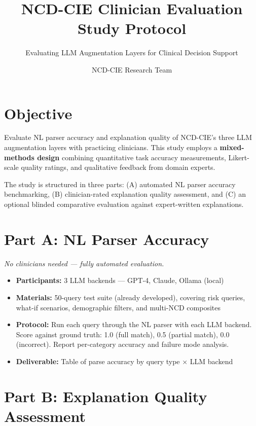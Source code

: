 \documentclass[runningheads,a4paper]{llncs}
\begin{document}
\title{NCD-CIE Clinician Evaluation Study Protocol}
\subtitle{Evaluating LLM Augmentation Layers for Clinical Decision Support}
\author{NCD-CIE Research Team}
\maketitle

\section{Objective}

Evaluate NL parser accuracy and explanation quality of NCD-CIE's three LLM augmentation layers with practicing clinicians. This study employs a \textbf{mixed-methods design} combining quantitative task accuracy measurements, Likert-scale quality ratings, and qualitative feedback from domain experts.

The study is structured in three parts: (A) automated NL parser accuracy benchmarking, (B) clinician-rated explanation quality assessment, and (C) an optional blinded comparative evaluation against expert-written explanations.

\section{Part A: NL Parser Accuracy}

\emph{No clinicians needed --- fully automated evaluation.}

\begin{itemize}[leftmargin=*]
  \item \textbf{Participants:} 3 LLM backends --- GPT-4, Claude, Ollama (local)
  \item \textbf{Materials:} 50-query test suite (already developed), covering risk queries, what-if scenarios, demographic filters, and multi-NCD composites
  \item \textbf{Protocol:} Run each query through the NL parser with each LLM backend. Score against ground truth: 1.0 (full match), 0.5 (partial match), 0.0 (incorrect). Report per-category accuracy and failure mode analysis.
  \item \textbf{Deliverable:} Table of parse accuracy by query type $\times$ LLM backend
\end{itemize}

\section{Part B: Explanation Quality Assessment}
\end{document}
